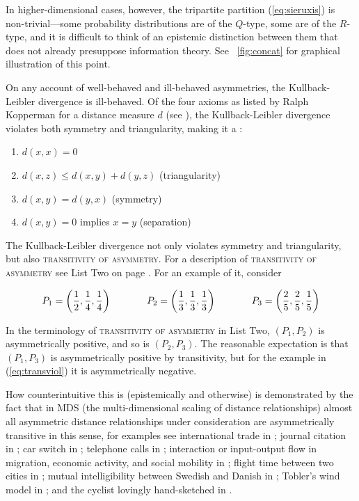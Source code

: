 \documentclass[phd,12pt,oneside]{ubcthesis}
\begin{document}
In higher-dimensional cases, however, the tripartite partition
(\ref{eq:sieruxis}) is non-trivial---some probability distributions
are of the $Q$-type, some are of the $R$-type, and it is difficult to
think of an epistemic distinction between them that does not already
presuppose information theory. See {\igure}~\ref{fig:concat} for
graphical illustration of this point.

On any account of well-behaved and ill-behaved asymmetries, the
Kullback-Leibler divergence is ill-behaved. Of the four axioms as
listed by Ralph Kopperman for a distance measure $d$ (see
), the Kullback-Leibler divergence violates
both symmetry and triangularity, making it a :

\begin{enumerate}[(m1)]
\item $d(x,x)=0$
\item $d(x,z)\leq{}d(x,y)+d(y,z)$ (triangularity)
\item $d(x,y)=d(y,x)$ (symmetry)
\item $d(x,y)=0$ implies $x=y$ (separation)
\end{enumerate}

The Kullback-Leibler divergence not only violates symmetry and
triangularity, but also \textsc{transitivity of asymmetry}. For a
description of \textsc{transitivity of asymmetry} see List Two on page
\pageref{page:listtwo}. For an example of it, consider

\begin{equation}
  \label{eq:transviol}
    P_{1}=\left(\frac{1}{2},\frac{1}{4},\frac{1}{4}\right)  \hspace{.5in}
    P_{2}=\left(\frac{1}{3},\frac{1}{3},\frac{1}{3}\right) \hspace{.5in}
    P_{3}=\left(\frac{2}{5},\frac{2}{5},\frac{1}{5}\right)
\end{equation}

{\noindent}In the terminology of \textsc{transitivity of asymmetry} in List Two,
$(P_{1},P_{2})$ is asymmetrically positive, and so is $(P_{2},P_{3})$.
The reasonable expectation is that $(P_{1},P_{3})$ is asymmetrically
positive by transitivity, but for the example in (\ref{eq:transviol})
it is asymmetrically negative.

How counterintuitive this is (epistemically and otherwise) is
demonstrated by the fact that in MDS (the multi-dimensional scaling of
distance relationships) almost all asymmetric distance relationships
under consideration are asymmetrically transitive in this sense, for
examples see international trade in ; journal
citation in ; car switch in
; telephone calls in
; interaction or input-output flow in
migration, economic activity, and social mobility in
; flight time between two cities in
; mutual intelligibility between Swedish
and Danish in ; Tobler's wind model in
; and the cyclist lovingly hand-sketched in
.
\end{document}
